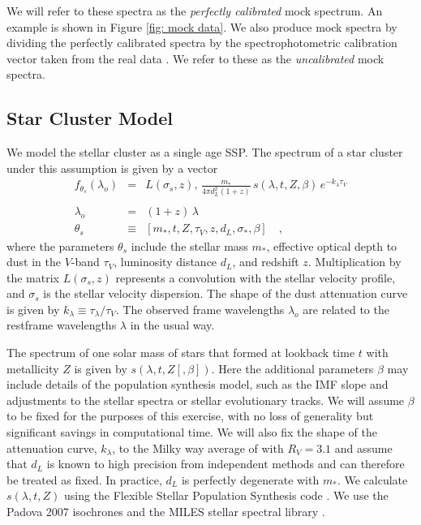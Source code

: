 \documentclass[iop,numberedappendix]{emulateapj}
\begin{document}
We will refer to these spectra as the \emph{perfectly calibrated} mock
spectrum.  An example is shown in Figure \ref{fig: mock data}. We also
produce mock spectra by dividing the perfectly calibrated spectra by
the spectrophotometric calibration vector taken from the real data
\citep[][Fig\ref{fig:ggc_spectrum}]{schiavon05}.  We refer to these as
the \emph{uncalibrated} mock spectra.

\subsection{Star Cluster Model}
\label{sec:cluster_model}
We model the stellar cluster as a single age SSP. The spectrum of a
star cluster under this assumption is given by a vector
\begin{eqnarray} \label{eq:StarModel}\displaystyle
f_{\theta_s}(\lambda_o) & = &
L(\sigma_s, z) ,\, \frac{m_*}{4\pi d_L^2(1+z)} \, s(\lambda, t, Z , \beta) \, e^ {-k_\lambda\tau_V} \\
\nonumber \\ 
\lambda_o & = & (1+z)\,\lambda 
\\
\theta_s & \equiv & \left[ m_*, t, Z, \tau_V, z, d_L, \sigma_*, \beta \right]
\quad ,
\end{eqnarray} where the
parameters $\theta_s$ include 
the stellar mass $m_*$, 
effective optical depth to dust in the $V$-band $\tau_V$, 
luminosity distance $d_L$,
and redshift $z$.
Multiplication by the matrix $L(\sigma_s, z)$ represents a convolution
with the stellar velocity profile,
and $\sigma_s$ is the stellar velocity dispersion. 
The shape of the dust attenuation curve is given by $k_\lambda \equiv
\tau_\lambda/\tau_V$.  
The observed frame wavelengths $\lambda_o$ are related to the
restframe wavelengths $\lambda$ in the usual way.

The spectrum of one solar mass of stars that formed at lookback time
$t$ with metallicity $Z$ is given by $s(\lambda, t, Z [, \beta])$.
Here the additional parameters $\beta$ may include details of the
population synthesis model, such as the IMF slope and adjustments to
the stellar spectra or stellar evolutionary tracks. We will assume
$\beta$ to be fixed for the purposes of this exercise, with no loss of
generality but significant savings in computational time.  We will
also fix the shape of the attenuation curve, $k_\lambda $, to the
Milky way average of \citet{CCM89} with $R_V=3.1$ and assume that
$d_L$ is known to high precision from independent methods and can
therefore be treated as fixed.  In practice, $d_L$ is perfectly
degenerate with $m_*$. We calculate $s(\lambda, t, Z)$ using the
Flexible Stellar Population Synthesis code \citep[FSPS][]{fsps}.  We
use the Padova 2007 isochrones \citep{girardi00, bertilli94, marigo07}
and the MILES stellar spectral library \citep{miles_I, miles_II,
miles_III}.
\end{document}
